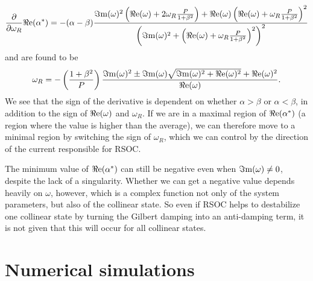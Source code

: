 \begin{align}
    \frac{\partial}{\partial\omega_R} {\Re\mathrm{e}}(\alpha^*) = -(\alpha-\beta)\frac{{\Im\mathrm{m}}(\omega)^2\left({\Re\mathrm{e}}(\omega)+2\omega_R\frac{P}{1+\beta^2}\right) + {\Re\mathrm{e}}(\omega)\left({\Re\mathrm{e}}(\omega)+\omega_R\frac{P}{1+\beta^2}\right)^2}{\left({\Im\mathrm{m}}(\omega)^2+\left({\Re\mathrm{e}}(\omega)+\omega_R\frac{P}{1+\beta^2}\right)^2\right)^2}
\end{align}
and are found to be
\begin{align}
    \omega_R = -\left(\frac{1+\beta^2}{P}\right)\frac{{\Im\mathrm{m}}(\omega)^2\pm{\Im\mathrm{m}}(\omega)\sqrt{{\Im\mathrm{m}}(\omega)^2+{\Re\mathrm{e}}(\omega)^2}+{\Re\mathrm{e}}(\omega)^2}{{\Re\mathrm{e}}(\omega)}.
\end{align}
We see that the sign of the derivative is dependent on whether $\alpha>\beta$ or $\alpha<\beta$, in addition to the sign of ${\Re\mathrm{e}}(\omega)$ and $\omega_R$. If we are in a maximal region of ${\Re\mathrm{e}}(\alpha^*)$ (a region where the value is higher than the average), we can therefore move to a minimal region by switching the sign of $\omega_R$, which we can control by the direction of the current responsible for RSOC. 

The minimum value of ${\Re\mathrm{e}}(\alpha^*)$ can still be negative even when ${\Im\mathrm{m}}(\omega)\neq0$, despite the lack of a singularity. Whether we can get a negative value depends heavily on $\omega$, however, which is a complex function not only of the system parameters, but also of the collinear state. So even if RSOC helps to destabilize one collinear state by turning the Gilbert damping into an anti-damping term, it is not given that this will occur for all collinear states.

\section{Numerical simulations}
